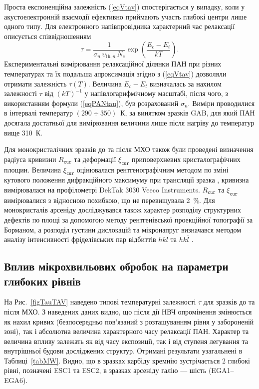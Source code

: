 Проста експоненційна залежність (\ref{eqVtav}) спостерігається у випадку, коли у акустоелектронній взаємодії ефективно приймають участь глибокі центри лише одного типу.
Для електронного напівпровідника характерний час релаксації описується співвідношенням \cite{Saiko1993,Rzanov,OstrovPAN}
\begin{equation}\label{eqPANtau}
  \tau=\frac{1}{\sigma_n\,\upsilon_{\mathrm{th},n}\,N_c}\exp\left(\frac{E_c-E_t}{kT}\right).
\end{equation}
Експериментальні вимірювання релаксаційної ділянки ПАН при різних температурах та їх подальша апроксимація згідно з (\ref{eqVtav}) дозволяли отримати
залежність $\tau(T)$.
Величина $E_c-E_t$ визначалась за нахилом залежності $\tau$ від $(kT)^{-1}$ у напівлогарифмічному масштабі, після чого, з використанням формули (\ref{eqPANtau}),
був розрахований $\sigma_n$.
Виміри проводилися в інтервалі температур $(290\div350)$~К,
за винятком зразків GAB, для який ПАН досягала достатньої для вимірювання величини лише після нагріву до температур вище 310~К.

Для монокристалічних зразків до та після МХО також були проведені визначення радіуса кривизни $R_\mathtt{cur}$ та
деформації $\xi_\mathtt{cur}$ приповерхневих кристалографічних площин.
Величина $\xi_\mathtt{cur}$ оцінювалася рентгенографічним методом по зміні кутового положення дифракційного максимуму при трансляції зразка \cite{Godwod},
кривизна вимірювалася на профілометрі DekTak 3030 Veeco Instruments.
$R_\mathtt{cur}$ та $\xi_\mathtt{cur}$ вимірювалися  з відносною похибкою, що не перевищувала 2~\%.
Для монокристалів арсеніду досліджувався також характер розподілу структурних дефектів по площі за допомогою методу
рентгенівської проекційної топографії за Борманом,
а розподіл густини дислокацій та мікронапруг визначався методом аналізу інтенсивності фріделівських пар відбиттів $hkl$ та $hk\overline{l}$ \cite{ThoricBook}.


\subsection{Вплив мікрохвильових обробок на параметри глибоких рівнів}

На Рис.~\ref{figTauTAV} наведено типові температурні залежності $\tau$ для зразків до та після МХО.
З наведених даних видно, що після дії НВЧ опромінення змінюється як нахил кривих (безпосередньо пов'язаний
з розташуванням рівня у забороненій зоні), так і абсолютна величина характерного часу релаксації ПАН.
Характер та величина впливу залежать як від часу експозиції, так і від ступеня легування та внутрішньої будови
досліджених структур.
Отримані результати узагальнені в Таблиці~\ref{tabMW}.
Видно, що в зразках карбіду кремнію зустрічається 2 глибокі рівні, позначені ESC1 та ESC2,
в зразках арсеніду галію --- шість (EGA1--EGA6).


